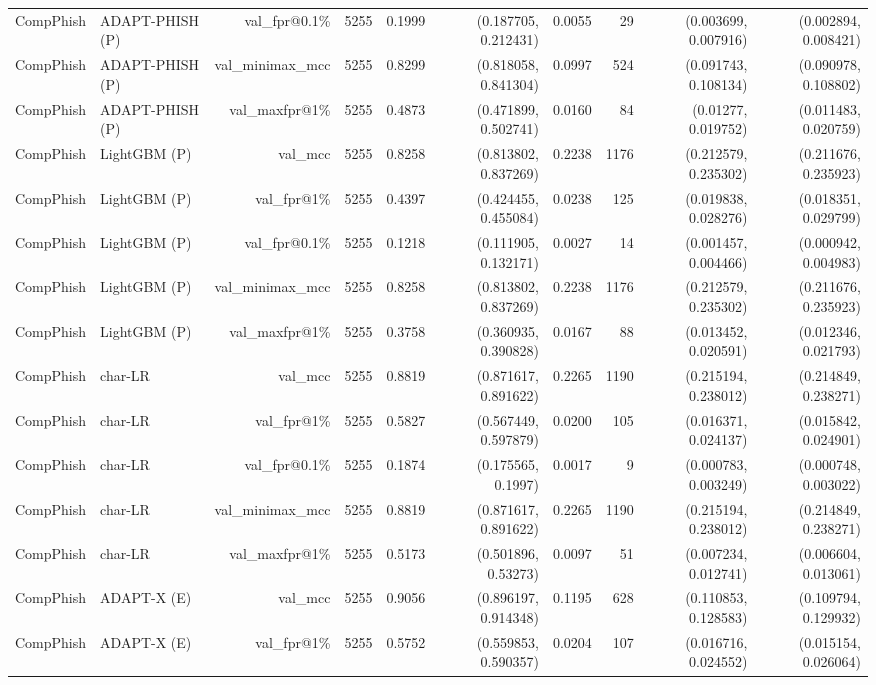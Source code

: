 \begin{table}[t]
\begin{tabular}{llrrrrrrrr}
CompPhish & ADAPT-PHISH (P) & val\_fpr@0.1\% & 5255 & 0.1999 & (0.187705, 0.212431) & 0.0055 & 29 & (0.003699, 0.007916) & (0.002894, 0.008421) \\
CompPhish & ADAPT-PHISH (P) & val\_minimax\_mcc & 5255 & 0.8299 & (0.818058, 0.841304) & 0.0997 & 524 & (0.091743, 0.108134) & (0.090978, 0.108802) \\
CompPhish & ADAPT-PHISH (P) & val\_maxfpr@1\% & 5255 & 0.4873 & (0.471899, 0.502741) & 0.0160 & 84 & (0.01277, 0.019752) & (0.011483, 0.020759) \\
CompPhish & LightGBM (P) & val\_mcc & 5255 & 0.8258 & (0.813802, 0.837269) & 0.2238 & 1176 & (0.212579, 0.235302) & (0.211676, 0.235923) \\
CompPhish & LightGBM (P) & val\_fpr@1\% & 5255 & 0.4397 & (0.424455, 0.455084) & 0.0238 & 125 & (0.019838, 0.028276) & (0.018351, 0.029799) \\
CompPhish & LightGBM (P) & val\_fpr@0.1\% & 5255 & 0.1218 & (0.111905, 0.132171) & 0.0027 & 14 & (0.001457, 0.004466) & (0.000942, 0.004983) \\
CompPhish & LightGBM (P) & val\_minimax\_mcc & 5255 & 0.8258 & (0.813802, 0.837269) & 0.2238 & 1176 & (0.212579, 0.235302) & (0.211676, 0.235923) \\
CompPhish & LightGBM (P) & val\_maxfpr@1\% & 5255 & 0.3758 & (0.360935, 0.390828) & 0.0167 & 88 & (0.013452, 0.020591) & (0.012346, 0.021793) \\
CompPhish & char-LR & val\_mcc & 5255 & 0.8819 & (0.871617, 0.891622) & 0.2265 & 1190 & (0.215194, 0.238012) & (0.214849, 0.238271) \\
CompPhish & char-LR & val\_fpr@1\% & 5255 & 0.5827 & (0.567449, 0.597879) & 0.0200 & 105 & (0.016371, 0.024137) & (0.015842, 0.024901) \\
CompPhish & char-LR & val\_fpr@0.1\% & 5255 & 0.1874 & (0.175565, 0.1997) & 0.0017 & 9 & (0.000783, 0.003249) & (0.000748, 0.003022) \\
CompPhish & char-LR & val\_minimax\_mcc & 5255 & 0.8819 & (0.871617, 0.891622) & 0.2265 & 1190 & (0.215194, 0.238012) & (0.214849, 0.238271) \\
CompPhish & char-LR & val\_maxfpr@1\% & 5255 & 0.5173 & (0.501896, 0.53273) & 0.0097 & 51 & (0.007234, 0.012741) & (0.006604, 0.013061) \\
CompPhish & ADAPT-X (E) & val\_mcc & 5255 & 0.9056 & (0.896197, 0.914348) & 0.1195 & 628 & (0.110853, 0.128583) & (0.109794, 0.129932) \\
CompPhish & ADAPT-X (E) & val\_fpr@1\% & 5255 & 0.5752 & (0.559853, 0.590357) & 0.0204 & 107 & (0.016716, 0.024552) & (0.015154, 0.026064) \\

\end{tabular}
\end{table}
